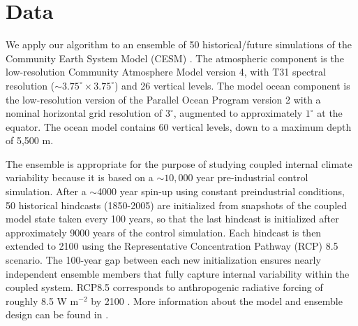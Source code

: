 \documentclass{ametsoc}
\begin{document}



\section{Data}
\label{sec:data}

We apply our algorithm to an ensemble of 50 historical/future simulations of the Community Earth System Model (CESM) \citep{sriver2015effects}.  The atmospheric component is the low-resolution Community Atmosphere Model version 4, with T31 spectral resolution (${\sim}3.75^\circ \times 3.75^\circ$) and 26 vertical levels. The model ocean component is the low-resolution version of the Parallel Ocean Program version 2 \citep{smith2010parallel} with a nominal horizontal grid resolution of $3^\circ$, augmented to approximately $1^\circ$ at the equator. The ocean model contains 60 vertical levels, down to a maximum depth of 5,500 m. 

The ensemble is appropriate for the purpose of studying coupled internal climate variability because it is based on a ${\sim}10{,}000$ year pre-industrial control simulation. After a $\sim$4000 year spin-up using constant preindustrial conditions, 50 historical hindcasts (1850-2005) are initialized from snapshots of the coupled model state taken every 100 years, so that the last hindcast is initialized after approximately 9000 years of the control simulation. Each hindcast is then extended to 2100 using the Representative Concentration Pathway (RCP) 8.5 scenario. The 100-year gap between each new initialization ensures nearly independent ensemble members that fully capture internal variability within the coupled system. RCP8.5 corresponds to anthropogenic radiative forcing of roughly 8.5 W m$^{-2}$ by 2100 \citep{moss2010next}. More information about the model and ensemble design can be found in \citet{sriver2015effects}.
\end{document}
